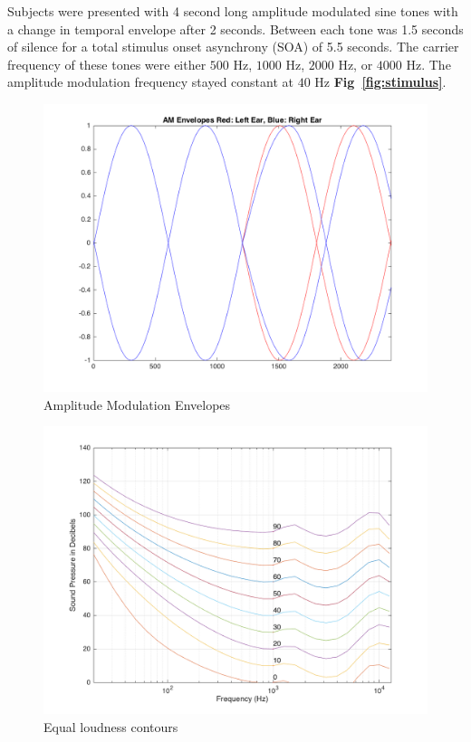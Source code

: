 \documentclass[12pt,journal,compsoc,twocolumn]{IEEEtran}
\begin{document}
Subjects were presented with 4 second long amplitude modulated sine tones with a change in temporal envelope after 2 seconds. Between each tone was 1.5 seconds of silence for a total stimulus onset asynchrony (SOA) of 5.5 seconds. The carrier frequency of these tones were either $500$ Hz, $1000$ Hz, $2000$ Hz, or $4000$ Hz. The amplitude modulation frequency stayed constant at $40$ Hz \textbf{Fig~\ref{fig:stimulus}}. 

\begin{figure}[t]
\centering
\includegraphics[width=3.5 in]{AM}
\caption{Amplitude Modulation Envelopes}
\label{fig:AM}
\end{figure}
 
\begin{figure}[b]
\centering
\includegraphics[width=3.5 in]{ELC}
\caption{Equal loudness contours}
\label{fig:ELC}
\end{figure}
 
\end{document}
